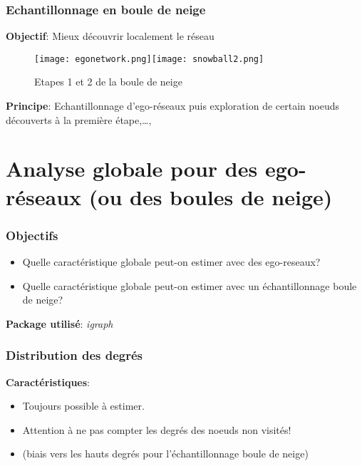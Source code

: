 \documentclass{beamer}
\begin{document}
\begin{frame}
\frametitle{Echantillonnage en boule de neige}

{\bf Objectif}: Mieux découvrir localement le réseau


 \begin{center}
 \begin{figure}
 \texttt{[image: egonetwork.png]}\hspace{1cm }\texttt{[image: snowball2.png]}   \caption{Etapes 1 et 2 de la boule de neige} 
 \end{figure}

 
 

 \end{center}

{\bf Principe}: Echantillonnage d'ego-réseaux puis  exploration de certain noeuds découverts à la première étape,\ldots, 








\end{frame}





\section{Analyse globale pour des ego-réseaux (ou des boules de neige)}


\begin{frame}
\frametitle{Objectifs}

\begin{itemize}
 \item Quelle caractéristique globale peut-on estimer avec des ego-reseaux? 
 \item Quelle caractéristique globale peut-on estimer avec un échantillonnage boule de neige?  
\end{itemize}


\vspace{1cm}

{\bf Package utilisé}: {\it igraph}
 
\end{frame}




\begin{frame}
 \frametitle{Distribution des degrés}
 
 {\bf Caractéristiques}: 
 \begin{itemize}
  \item Toujours possible à estimer.
  \item Attention à ne pas compter les degrés des noeuds non visités!
  \item (biais vers les hauts degrés pour l'échantillonnage boule de neige)
 \end{itemize}

 
 
 
 
\end{frame}
\end{document}
